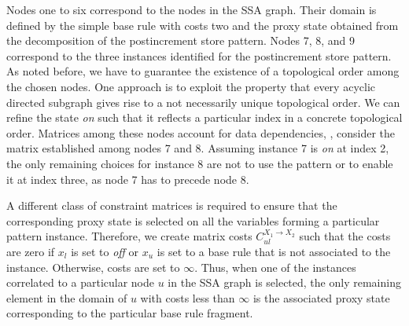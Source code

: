 Nodes one to six correspond to the nodes in the SSA graph. Their
domain is defined by the simple base rule with costs two and the proxy
state obtained from the decomposition of the postincrement store
pattern. Nodes 7, 8, and 9 correspond to the three instances
identified for the postincrement store pattern. As noted before, we
have to guarantee the existence of a topological order among the
chosen nodes.  One approach is to exploit the property that every
acyclic directed subgraph gives rise to a not necessarily unique
topological order.  We can refine the state \textit{on} such that it
reflects a particular index in a concrete topological order. Matrices
among these nodes account for data dependencies, \eg, consider the
matrix established among nodes 7 and 8. Assuming instance 7 is
\textit{on} at index 2, the only remaining choices for instance 8 are
not to use the pattern or to enable it at index three, as node 7 has
to precede node 8.

A different class of constraint matrices is required to ensure that
the corresponding proxy state is selected on all the variables forming
a particular pattern instance. Therefore, we create matrix costs
$C^{X_1 \rightarrow X_2}_{ul}$ such that the costs are zero if $x_l$
is set to \textit{off\/} or $x_u$ is set to a base rule that is not
associated to the instance. Otherwise, costs are set to $\infty$.
Thus, when one of the instances correlated to a particular node $u$ in
the SSA graph is selected, the only remaining element in the domain of
$u$ with costs less than $\infty$ is the associated proxy state
corresponding to the particular base rule fragment.

